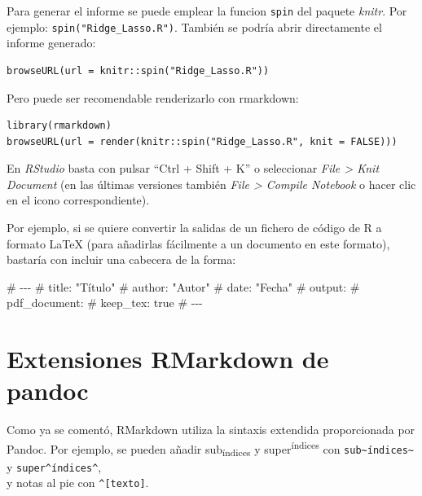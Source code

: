 \documentclass[
]{book}
\newenvironment{Shaded}{\begin{snugshade}}{\end{snugshade}}
\newcommand{\NormalTok}[1]{#1}
\theoremstyle{definition}
\theoremstyle{definition}
\theoremstyle{definition}
\theoremstyle{definition}
\theoremstyle{remark}
\begin{document}
Para generar el informe se puede emplear la funcion \texttt{spin} del paquete \emph{knitr}. Por ejemplo: \texttt{spin("Ridge\_Lasso.R")}.
También se podría abrir directamente el informe generado:

\begin{verbatim}
browseURL(url = knitr::spin("Ridge_Lasso.R"))
\end{verbatim}

Pero puede ser recomendable renderizarlo con rmarkdown:

\begin{verbatim}
library(rmarkdown)
browseURL(url = render(knitr::spin("Ridge_Lasso.R", knit = FALSE)))
\end{verbatim}

En \emph{RStudio} basta con pulsar ``Ctrl + Shift + K'' o seleccionar \emph{File \textgreater{} Knit Document} (en las últimas versiones también \emph{File \textgreater{} Compile Notebook} o hacer clic en el icono correspondiente).

Por ejemplo, si se quiere convertir la salidas de un fichero de código de R a formato LaTeX
(para añadirlas fácilmente a un documento en este formato), bastaría con incluir una cabecera de
la forma:

\begin{Shaded}
\begin{Highlighting}[]
\NormalTok{\#\textquotesingle{} {-}{-}{-}}
\NormalTok{\#\textquotesingle{} title: "Título"}
\NormalTok{\#\textquotesingle{} author: "Autor"}
\NormalTok{\#\textquotesingle{} date: "Fecha"}
\NormalTok{\#\textquotesingle{} output:}
\NormalTok{\#\textquotesingle{}   pdf\_document:}
\NormalTok{\#\textquotesingle{}      keep\_tex: true}
\NormalTok{\#\textquotesingle{} {-}{-}{-}}
\end{Highlighting}
\end{Shaded}

\hypertarget{extensiones-rmarkdown-de-pandoc}{%
\section{Extensiones RMarkdown de pandoc}\label{extensiones-rmarkdown-de-pandoc}}

Como ya se comentó, RMarkdown utiliza la sintaxis extendida proporcionada por Pandoc.
Por ejemplo, se pueden añadir sub\textsubscript{índices} y super\textsuperscript{índices} con \texttt{sub\textasciitilde{}índices\textasciitilde{}} y \texttt{super\^{}índices\^{}},\\
y notas al pie con \texttt{\^{}{[}texto{]}}.
\end{document}
